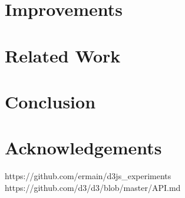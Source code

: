 \documentclass[a4paper]{article}
\begin{document}
\section{Improvements}

\section{Related Work}

\section{Conclusion}


\section{Acknowledgements}


\begin{thebibliography}{9}
 https://github.com/ermain/d3js\_experiments
 https://github.com/d3/d3/blob/master/API.md
\end{thebibliography}

\end{document}
